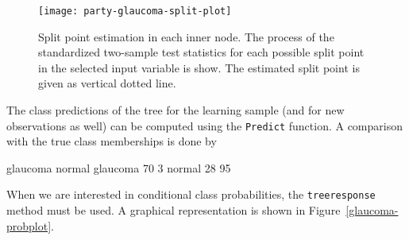 \documentclass{Z}
\begin{document}
\begin{figure}[t]
\begin{center}
\begin{Schunk}
\end{Schunk}
\texttt{[image: party-glaucoma-split-plot]}
\caption{Split point estimation in each inner node. The process of 
         the standardized two-sample test statistics for each possible 
         split point in the selected input variable is show.
         The estimated split point is given as vertical dotted line.
         \label{glaucoma-split}}
\end{center}
\end{figure}

The class predictions of the tree for the learning sample (and for new
observations as well) can be computed using the \texttt{Predict} function. A
comparison with the true class memberships is done by
\begin{Schunk}
\begin{Soutput}
           glaucoma normal
  glaucoma       70      3
  normal         28     95
\end{Soutput}
\end{Schunk}
When we are interested in conditional class probabilities, the
\texttt{treeresponse} method must be used. A graphical representation is
shown in Figure~\ref{glaucoma-probplot}.
\end{document}
